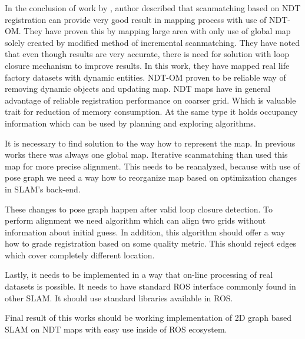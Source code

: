 In the conclusion of work by \cite{NDTOMFusion}, author described that scanmatching based on \gls{NDT} registration can provide very good result in mapping process with use of \gls{NDT-OM}. They have proven this by mapping large area with only use of global map solely created by modified method of  incremental scanmatching. They have noted that even though results are very accurate, there is need for solution with loop closure mechanism to improve results. In this work, they have mapped real life factory datasets with dynamic entities. \gls{NDT-OM} proven to be reliable way of removing dynamic objects and updating map. \gls{NDT} maps have in general advantage of reliable registration performance on coarser grid. Which is valuable trait for reduction of memory consumption. At the same type it holds occupancy information which can be used by planning and exploring algorithms.

It is necessary to find solution to the way how to represent the map. In previous works there was always one global map. Iterative scanmatching than used this map for more precise alignment. This needs to be reanalyzed, because with use of pose graph we need a way how to reorganize map based on optimization changes in \gls{SLAM}'s back-end.  

These changes to pose graph happen after valid loop closure detection. To perform alignment we need algorithm which can align two grids without information about initial guess. In addition, this algorithm should offer a way how to grade registration based on some quality metric. This should reject edges which cover completely different location.

Lastly, it needs to be implemented in a way that on-line processing of real datasets is possible. It needs to have standard \gls{ROS} interface commonly found in other \gls{SLAM}. It should use standard libraries available in \gls{ROS}.

Final result of this works should be working implementation of 2D graph based \gls{SLAM} on NDT maps with easy use inside of \gls{ROS} ecosystem. 

     

